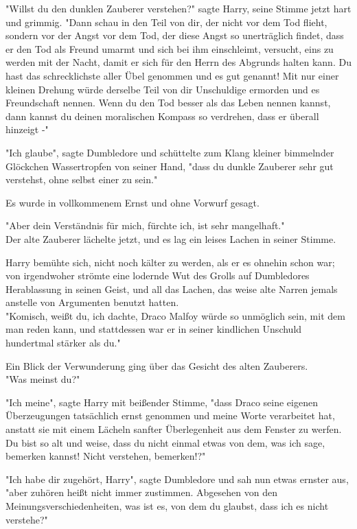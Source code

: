 {"Willst du den dunklen Zauberer verstehen?" sagte Harry, seine Stimme jetzt hart und grimmig. "Dann schau in den Teil von dir, der nicht vor dem Tod flieht, sondern vor der Angst vor dem Tod, der diese Angst so unerträglich findet, dass er den Tod als Freund umarmt und sich bei ihm einschleimt, versucht, eins zu werden mit der Nacht, damit er sich für den Herrn des Abgrunds halten kann. Du hast das schrecklichste aller Übel genommen und es gut genannt! Mit nur einer kleinen Drehung würde derselbe Teil von dir Unschuldige ermorden und es Freundschaft nennen. Wenn du den Tod besser als das Leben nennen kannst, dann kannst du deinen moralischen Kompass so verdrehen, dass er überall hinzeigt -"

"Ich glaube", sagte Dumbledore und schüttelte zum Klang kleiner bimmelnder Glöckchen Wassertropfen von seiner Hand, "dass du dunkle Zauberer sehr gut verstehst, ohne selbst einer zu sein."

Es wurde in vollkommenem Ernst und ohne Vorwurf gesagt.

"Aber dein Verständnis für mich, fürchte ich, ist sehr mangelhaft."\\ Der alte Zauberer lächelte jetzt, und es lag ein leises Lachen in seiner Stimme.

Harry bemühte sich, nicht noch kälter zu werden, als er es ohnehin schon war; von irgendwoher strömte eine lodernde Wut des Grolls auf Dumbledores Herablassung in seinen Geist, und all das Lachen, das weise alte Narren jemals anstelle von Argumenten benutzt hatten.\\ "Komisch, weißt du, ich dachte, Draco Malfoy würde so unmöglich sein, mit dem man reden kann, und stattdessen war er in seiner kindlichen Unschuld hundertmal stärker als du."

Ein Blick der Verwunderung ging über das Gesicht des alten Zauberers.\\ "Was meinst du?"

"Ich meine", sagte Harry mit beißender Stimme, "dass Draco seine eigenen Überzeugungen tatsächlich ernst genommen und meine Worte verarbeitet hat, anstatt sie mit einem Lächeln sanfter Überlegenheit aus dem Fenster zu werfen. Du bist so alt und weise, dass du nicht einmal etwas von dem, was ich sage, bemerken kannst! Nicht verstehen, bemerken!?"

"Ich habe dir zugehört, Harry", sagte Dumbledore und sah nun etwas ernster aus, "aber zuhören heißt nicht immer zustimmen. Abgesehen von den Meinungsverschiedenheiten, was ist es, von dem du glaubst, dass ich es nicht verstehe?"

}
